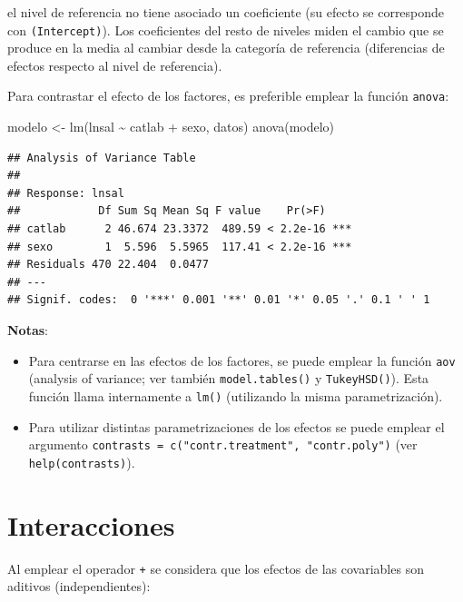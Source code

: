\documentclass[
]{book}
\newenvironment{Shaded}{\begin{snugshade}}{\end{snugshade}}
\newcommand{\FunctionTok}[1]{\textcolor[rgb]{0.00,0.00,0.00}{#1}}
\newcommand{\NormalTok}[1]{#1}
\newcommand{\OtherTok}[1]{\textcolor[rgb]{0.56,0.35,0.01}{#1}}
\newcommand{\SpecialCharTok}[1]{\textcolor[rgb]{0.00,0.00,0.00}{#1}}
\theoremstyle{break}
\begin{document}
el nivel de referencia no tiene asociado un coeficiente (su efecto se corresponde con \texttt{(Intercept)}). Los coeficientes del resto de niveles miden el cambio que se produce en la media al cambiar desde la categoría de referencia (diferencias de efectos respecto al nivel de referencia).

Para contrastar el efecto de los factores, es preferible emplear la función \texttt{anova}:

\begin{Shaded}
\begin{Highlighting}[]
\NormalTok{modelo }\OtherTok{\textless{}{-}} \FunctionTok{lm}\NormalTok{(lnsal }\SpecialCharTok{\textasciitilde{}}\NormalTok{ catlab }\SpecialCharTok{+}\NormalTok{ sexo, datos)}
\FunctionTok{anova}\NormalTok{(modelo)}
\end{Highlighting}
\end{Shaded}

\begin{verbatim}
## Analysis of Variance Table
## 
## Response: lnsal
##            Df Sum Sq Mean Sq F value    Pr(>F)    
## catlab      2 46.674 23.3372  489.59 < 2.2e-16 ***
## sexo        1  5.596  5.5965  117.41 < 2.2e-16 ***
## Residuals 470 22.404  0.0477                      
## ---
## Signif. codes:  0 '***' 0.001 '**' 0.01 '*' 0.05 '.' 0.1 ' ' 1
\end{verbatim}

\textbf{Notas}:

\begin{itemize}
\item
  Para centrarse en las efectos de los factores, se puede emplear la función
  \texttt{aov} (analysis of variance; ver también \texttt{model.tables()} y \texttt{TukeyHSD()}). Esta
  función llama internamente a \texttt{lm()} (utilizando la misma parametrización).
\item
  Para utilizar distintas parametrizaciones de los efectos se puede emplear
  el argumento \texttt{contrasts\ =\ c("contr.treatment",\ "contr.poly")}
  (ver \texttt{help(contrasts)}).
\end{itemize}

\hypertarget{interacciones}{%
\section{Interacciones}\label{interacciones}}

Al emplear el operador \texttt{+} se considera que los efectos de las covariables son aditivos (independientes):
\end{document}
